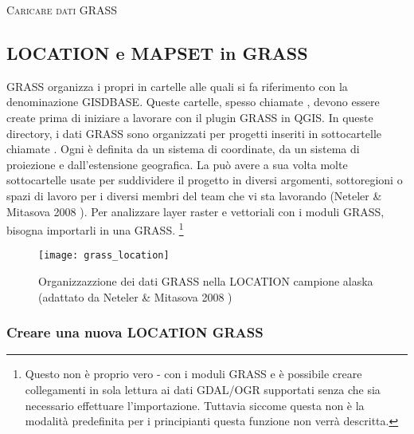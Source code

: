 \begin{Tip}\caption{\textsc{Caricare dati GRASS}}
\end{Tip} 

\subsection{LOCATION e MAPSET in GRASS}\label{sec:about_loc}

GRASS organizza i propri in cartelle alle quali si fa riferimento con la
denominazione GISDBASE. Queste cartelle, spesso chiamate ,
devono essere create prima di iniziare a lavorare con il plugin GRASS in QGIS.
In queste directory, i dati GRASS sono organizzati per progetti inseriti in
sottocartelle chiamate . 
Ogni  è definita da un sistema di coordinate, da un sistema
di proiezione e dall'estensione geografica. La  può avere a
sua volta molte sottocartelle  usate per suddividere il
progetto in diversi argomenti, sottoregioni o spazi di lavoro per i diversi
membri del team che vi sta lavorando (Neteler \& Mitasova 2008
\cite{neteler_mitasova08}). Per analizzare layer raster e vettoriali con i
moduli GRASS, bisogna importarli in una  GRASS.
\footnote{Questo non è proprio vero - con i moduli GRASS 
e  è possibile creare collegamenti in sola lettura ai
dati GDAL/OGR supportati senza che sia necessario effettuare l'importazione.
Tuttavia siccome questa non è la modalità predefinita per i principianti
questa funzione non verrà descritta.}

\begin{figure}[ht]
\begin{center}
\caption{Organizzazzione dei dati GRASS nella LOCATION campione alaska
(adattato da Neteler \& Mitasova 2008 \cite{neteler_mitasova08})}\label{fig:grass_location}\smallskip
\texttt{[image: grass\_location]}
\end{center}  
\end{figure}

\subsubsection{Creare una nuova LOCATION GRASS}\label{sec:create_loc}

